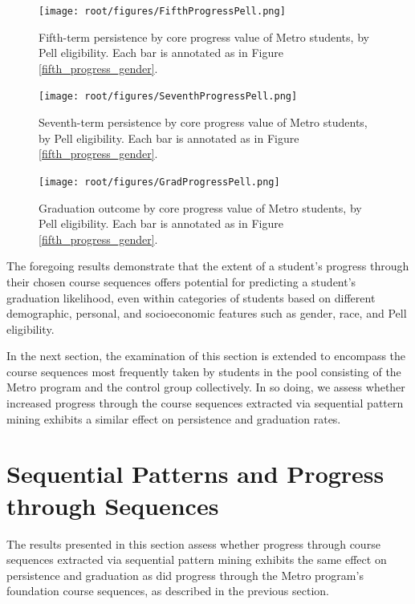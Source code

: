 \begin{figure}[htbp]
\centering
\texttt{[image: root/figures/FifthProgressPell.png]}
\caption{Fifth-term persistence by core progress value of Metro students, by Pell eligibility. Each bar is annotated as in Figure \ref{fifth_progress_gender}.}
\label{fifth_progress_pell}
\end{figure}

\begin{figure}[htbp]
\centering
\texttt{[image: root/figures/SeventhProgressPell.png]}
\caption{Seventh-term persistence by core progress value of Metro students, by Pell eligibility.  Each bar is annotated as in Figure \ref{fifth_progress_gender}.}
\label{seventh_progress_pell}
\end{figure}

\begin{figure}[htbp]
\centering
\texttt{[image: root/figures/GradProgressPell.png]}
\caption{Graduation outcome by core progress value of Metro students, by Pell eligibility.  Each bar is annotated as in Figure \ref{fifth_progress_gender}.}
\label{grad_progress_pell}
\end{figure}

The foregoing results demonstrate that the extent of a student's progress through their chosen course sequences offers potential for predicting a student's graduation likelihood, even within categories of students based on different demographic, personal, and socioeconomic features such as gender, race, and Pell eligibility.  

In the next section, the examination of this section is extended to encompass the course sequences most frequently taken by students in the pool consisting of the Metro program and the control group collectively.   In so doing, we assess whether increased progress through the course sequences extracted via sequential pattern mining exhibits a similar effect on persistence and graduation rates.  


\section{Sequential Patterns and Progress through Sequences}
\label{results_chosensequences}

The results presented in this section assess whether progress through course sequences extracted via sequential pattern mining exhibits the same effect on persistence and graduation as did progress through the Metro program's foundation course sequences, as described in the previous section.  

